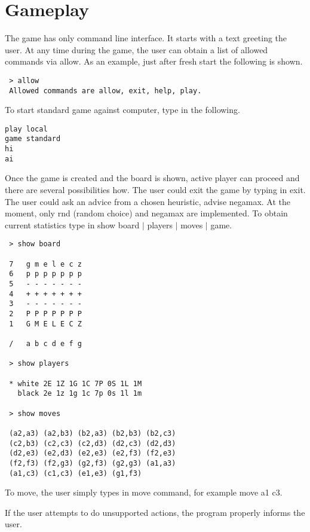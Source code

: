 \section{Gameplay}

The game has only command line interface. It starts with a text greeting the
user. At any time during the game, the user can obtain a list of allowed
commands via \textsf{allow}. As an example, just after fresh start the
following is shown.
\begin{verbatim}
 > allow
 Allowed commands are allow, exit, help, play.
\end{verbatim}

To start standard game against computer, type in the following.
\begin{verbatim}
play local
game standard
hi
ai
\end{verbatim}

Once the game is created and the board is shown, active player can proceed and
there are several possibilities how. The user could exit the game by typing in
\textsf{exit}. The user could ask an advice from a chosen heuristic,
\textsf{advise negamax}. At the moment, only \textsf{rnd} (random choice) and
\textsf{negamax} are implemented. To obtain current statistics type in
\textsf{show board $\mid$ players $\mid$ moves $\mid$ game}.
\begin{verbatim}
 > show board

 7   g m e l e c z
 6   p p p p p p p
 5   - - - - - - -
 4   + + + + + + +
 3   - - - - - - -
 2   P P P P P P P
 1   G M E L E C Z

 /   a b c d e f g

 > show players

 * white 2E 1Z 1G 1C 7P 0S 1L 1M
   black 2e 1z 1g 1c 7p 0s 1l 1m

 > show moves

 (a2,a3) (a2,b3) (b2,a3) (b2,b3) (b2,c3)
 (c2,b3) (c2,c3) (c2,d3) (d2,c3) (d2,d3)
 (d2,e3) (e2,d3) (e2,e3) (e2,f3) (f2,e3)
 (f2,f3) (f2,g3) (g2,f3) (g2,g3) (a1,a3)
 (a1,c3) (c1,c3) (e1,e3) (g1,f3)
\end{verbatim}

To move, the user simply types in \textsf{move} command, for example
\textsf{move a1 c3}.

\vspace{0.5em}

If the user attempts to do unsupported actions, the program properly informs
the user.

\vspace{0.5em}

